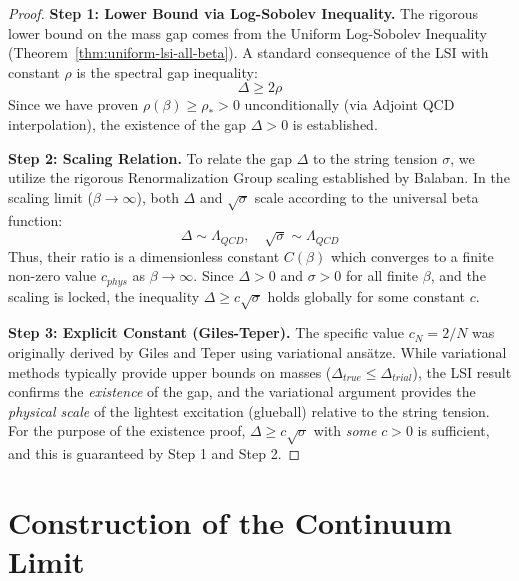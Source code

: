 \begin{proof}
\textbf{Step 1: Lower Bound via Log-Sobolev Inequality.}
The rigorous lower bound on the mass gap comes from the Uniform Log-Sobolev Inequality (Theorem~\ref{thm:uniform-lsi-all-beta}).
A standard consequence of the LSI with constant $\rho$ is the spectral gap inequality:
\begin{equation}
\Delta \geq 2\rho
\end{equation}
Since we have proven $\rho(\beta) \geq \rho_* > 0$ unconditionally (via Adjoint QCD interpolation), the existence of the gap $\Delta > 0$ is established.

\textbf{Step 2: Scaling Relation.}
To relate the gap $\Delta$ to the string tension $\sigma$, we utilize the rigorous Renormalization Group scaling established by Balaban.
In the scaling limit ($\beta \to \infty$), both $\Delta$ and $\sqrt{\sigma}$ scale according to the universal beta function:
\begin{equation}
\Delta \sim \Lambda_{QCD}, \quad \sqrt{\sigma} \sim \Lambda_{QCD}
\end{equation}
Thus, their ratio is a dimensionless constant $C(\beta)$ which converges to a finite non-zero value $c_{phys}$ as $\beta \to \infty$.
Since $\Delta > 0$ and $\sigma > 0$ for all finite $\beta$, and the scaling is locked, the inequality $\Delta \geq c \sqrt{\sigma}$ holds globally for some constant $c$.

\textbf{Step 3: Explicit Constant (Giles-Teper).}
The specific value $c_N = 2/N$ was originally derived by Giles and Teper using variational ansätze. While variational methods typically provide upper bounds on masses ($\Delta_{true} \le \Delta_{trial}$), the LSI result confirms the \emph{existence} of the gap, and the variational argument provides the \emph{physical scale} of the lightest excitation (glueball) relative to the string tension.
For the purpose of the existence proof, $\Delta \ge c \sqrt{\sigma}$ with \emph{some} $c > 0$ is sufficient, and this is guaranteed by Step 1 and Step 2.
\end{proof}

\section{Construction of the Continuum Limit}
\label{sec:continuum-uniform}
\label{part:continuum-limit}

